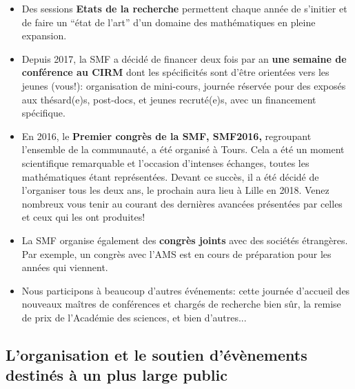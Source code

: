 \begin{itemize}
 \item
Des sessions {\bf Etats de la recherche}   permettent chaque ann\'ee  de s'initier  et de faire un ``\'etat de l'art'' d'un domaine des math\'{e}matiques en pleine expansion. 
\item
Depuis 2017, la SMF a d\'ecid\'e de financer deux fois par an {\bf une semaine de conf\'erence au CIRM} dont les sp\'ecificit\'es sont d'\^etre orient\'ees vers les jeunes (vous!): organisation de mini-cours, journ\'ee r\'eserv\'ee pour des expos\'es aux th\'esard(e)s, post-docs, et jeunes recrut\'e(e)s, avec un financement sp\'ecifique.
\item
En 2016, le {\bf Premier congr\`es de la SMF, SMF2016,} regroupant l'ensemble de la communaut\'e, a \'et\'e organis\'e \`a Tours. Cela a \'et\'e un moment scientifique remarquable  et l'occasion d'intenses \'echanges, toutes les math\'ematiques \'etant repr\'esent\'ees. Devant ce succ\`es, il a \'et\'e  d\'ecid\'e de l'organiser tous les deux ans, le prochain aura lieu \`a Lille en 2018. Venez nombreux vous tenir au courant des derni\`eres avanc\'ees pr\'esent\'ees par celles et ceux qui les ont produites!

\item
La SMF organise \'egalement des {\bf congr\`es joints} avec des soci\'et\'es \'etrang\`eres. Par exemple, un congr\`es avec l'AMS  est en cours de pr\'eparation pour les ann\'ees qui viennent. 

\item Nous participons \`a beaucoup d'autres \'ev\'enements: cette journ\'ee d'accueil des nouveaux ma\^itres de
conf\'erences et charg\'es de recherche bien s\^ur, la remise de prix de l'Acad\'emie des sciences, et bien d'autres...

\end{itemize}


\subsection{L'organisation et le soutien d'\'{e}v\`{e}nements destin\'es \`a un plus large public} 

